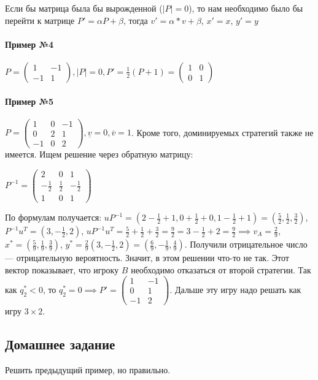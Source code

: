 \documentclass{article}
\begin{document}
Если бы матрица была бы вырожденной ($|P| = 0$), то нам необходимо было бы перейти к матрице $P' = \alpha P + \beta$, тогда $v' = \alpha * v + \beta$, $x' = x$, $y' = y$

\paragraph{Пример №4}

$P = \begin{pmatrix}
    1 & -1 \\
    -1 & 1
\end{pmatrix}, |P| = 0, P' = \frac{1}{2} (P + 1) = \begin{pmatrix}
    1 & 0 \\
    0 & 1
\end{pmatrix}$

\paragraph{Пример №5}

$P = \begin{pmatrix}
    1 & 0 & -1 \\
    0 & 2 & 1 \\
    -1 & 0 & 2 
\end{pmatrix}, \underline{v} = 0, \overline{v} = 1$. Кроме того, доминируемых стратегий также не имеется. Ищем решение через обратную матрицу:

$P^{-1} = \begin{pmatrix}
    2 & 0 & 1 \\
    -\frac{1}{2} & \frac{1}{2} & -\frac{1}{2} \\
    1 & 0 & 1
\end{pmatrix}$

По формулам получается: $u P^{-1} = (2 - \frac{1}{2} + 1, 0 + \frac{1}{2} + 0, 1 - \frac{1}{2} + 1) = ( \frac{5}{2}, \frac{1}{2}, \frac{3}{2} )$, $P^{-1} u^{T} = (3, -\frac{1}{2}, 2)$, $u P^{-1} u^{T} = \frac{5}{2} + \frac{1}{2} + \frac{3}{2} = \frac{9}{2} = 3 - \frac{1}{2} + 2 = \frac{9}{2} \implies v_{A} = \frac{2}{9}$, $x^{*} = ( \frac{5}{9}, \frac{1}{9}, \frac{3}{9} )$, $y^{*} = \frac{2}{9} (3, -\frac{1}{2}, 2) = ( \frac{6}{9}, -\frac{1}{9}, \frac{4}{9})$. Получили отрицательное число — отрицательную вероятность. Значит, в этом решении что-то не так. Этот вектор показывает, что игроку $B$ необходимо отказаться от второй стратегии. Так как $q_{2}^{*} < 0$, то $q_{2}^{*} = 0 \implies P' = \begin{pmatrix}
    1 & -1 \\
    0 & 1 \\
    -1 & 2
\end{pmatrix}$. Дальше эту игру надо решать как игру $3 \times 2$.

\subsection{Домашнее задание}

Решить предыдущий пример, но правильно.
\end{document}
